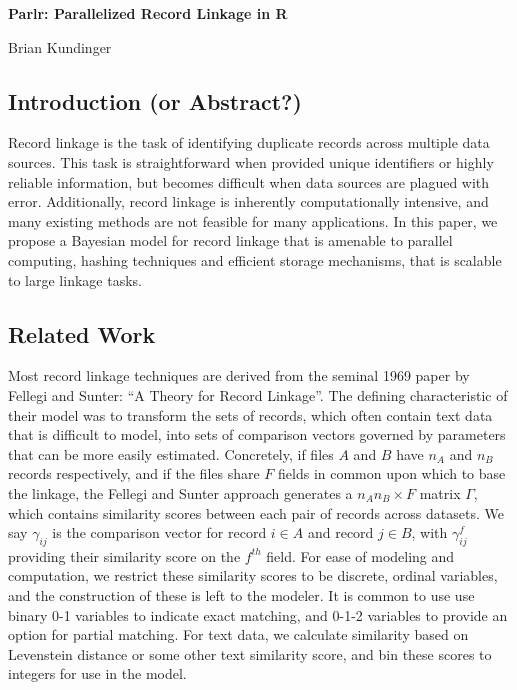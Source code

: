 \documentclass[
  12pt,
]{article}
\author{}
\date{\vspace{-2.5em}}
\begin{document}
\begin{flushright} 
    \end{flushright}
    \begin{center} \textbf{Parlr: Parallelized Record Linkage in R}
    
    Brian Kundinger

    \end{center}

\hypertarget{introduction-or-abstract}{%
\subsection{Introduction (or
Abstract?)}\label{introduction-or-abstract}}

Record linkage is the task of identifying duplicate records across
multiple data sources. This task is straightforward when provided unique
identifiers or highly reliable information, but becomes difficult when
data sources are plagued with error. Additionally, record linkage is
inherently computationally intensive, and many existing methods are not
feasible for many applications. In this paper, we propose a Bayesian
model for record linkage that is amenable to parallel computing, hashing
techniques and efficient storage mechanisms, that is scalable to large
linkage tasks.

\hypertarget{related-work}{%
\subsection{Related Work}\label{related-work}}

Most record linkage techniques are derived from the seminal 1969 paper
by Fellegi and Sunter: ``A Theory for Record Linkage''. The defining
characteristic of their model was to transform the sets of records,
which often contain text data that is difficult to model, into sets of
comparison vectors governed by parameters that can be more easily
estimated. Concretely, if files \(A\) and \(B\) have \(n_A\) and \(n_B\)
records respectively, and if the files share \(F\) fields in common upon
which to base the linkage, the Fellegi and Sunter approach generates a
\(n_A n_B \times F\) matrix \(\Gamma\), which contains similarity scores
between each pair of records across datasets. We say \(\gamma_{ij}\) is
the comparison vector for record \(i \in A\) and record \(j \in B\),
with \(\gamma_{ij}^f\) providing their similarity score on the
\(f^{th}\) field. For ease of modeling and computation, we restrict
these similarity scores to be discrete, ordinal variables, and the
construction of these is left to the modeler. It is common to use use
binary 0-1 variables to indicate exact matching, and 0-1-2 variables to
provide an option for partial matching. For text data, we calculate
similarity based on Levenstein distance or some other text similarity
score, and bin these scores to integers for use in the model.
\end{document}
